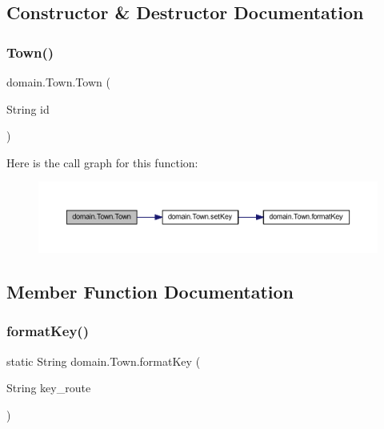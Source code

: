 \subsection{Constructor \& Destructor Documentation}
\mbox{\label{classdomain_1_1_town_aa94ed3b3a105cf53298454563e2302a8}} 
\subsubsection{\texorpdfstring{Town()}{Town()}}
{\footnotesize\ttfamily domain.\+Town.\+Town (\begin{DoxyParamCaption}\item[{String}]{id }\end{DoxyParamCaption})}

Here is the call graph for this function\+:\nopagebreak
\begin{figure}[H]
\begin{center}
\leavevmode
\includegraphics[width=350pt]{classdomain_1_1_town_aa94ed3b3a105cf53298454563e2302a8_cgraph}
\end{center}
\end{figure}


\subsection{Member Function Documentation}
\mbox{\label{classdomain_1_1_town_a6a88af9728067dd135eea6df9591496b}} 
\subsubsection{\texorpdfstring{format\+Key()}{formatKey()}}
{\footnotesize\ttfamily static String domain.\+Town.\+format\+Key (\begin{DoxyParamCaption}\item[{String}]{key\+\_\+route }\end{DoxyParamCaption})\hspace{0.3cm}{\ttfamily [static]}}

